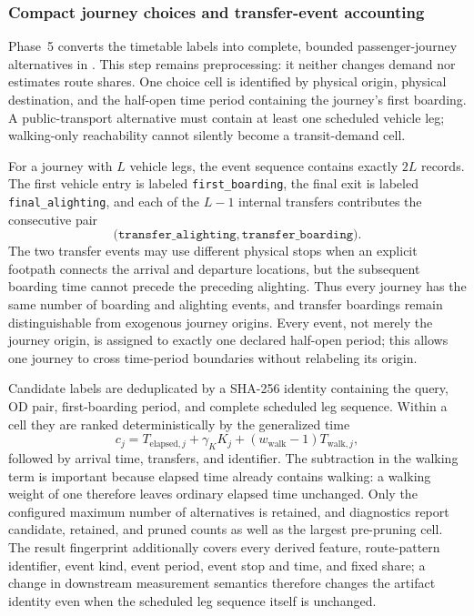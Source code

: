 \subsubsection{Compact journey choices and transfer-event accounting}
\label{sec:reduced-od-journey-choices}

Phase~5 converts the timetable labels into complete, bounded passenger-journey
alternatives in
.  This
step remains preprocessing: it neither changes demand nor estimates route
shares.  One choice cell is identified by physical origin, physical
destination, and the half-open time period containing the journey's first
boarding.  A public-transport alternative must contain at least one scheduled
vehicle leg; walking-only reachability cannot silently become a transit-demand
cell.

For a journey with $L$ vehicle legs, the event sequence contains exactly $2L$
records.  The first vehicle entry is labeled
\texttt{first\_boarding}, the final exit is labeled
\texttt{final\_alighting}, and each of the $L-1$ internal transfers contributes
the consecutive pair
\[
\bigl(\texttt{transfer\_alighting},
      \texttt{transfer\_boarding}\bigr).
\]
The two transfer events may use different physical stops when an explicit
footpath connects the arrival and departure locations, but the subsequent
boarding time cannot precede the preceding alighting.  Thus every journey has
the same number of boarding and alighting events, and transfer boardings remain
distinguishable from exogenous journey origins.  Every event, not merely the
journey origin, is assigned to exactly one declared half-open period; this
allows one journey to cross time-period boundaries without relabeling its
origin.

Candidate labels are deduplicated by a SHA-256 identity containing the query,
OD pair, first-boarding period, and complete scheduled leg sequence.  Within a
cell they are ranked deterministically by the generalized time
\[
c_j=T_{\mathrm{elapsed},j}
    +\gamma_K K_j
    +(w_{\mathrm{walk}}-1)T_{\mathrm{walk},j},
\]
followed by arrival time, transfers, and identifier.  The subtraction in the
walking term is important because elapsed time already contains walking: a
walking weight of one therefore leaves ordinary elapsed time unchanged.  Only
the configured maximum number of alternatives is retained, and diagnostics
report candidate, retained, and pruned counts as well as the largest
pre-pruning cell.
The result fingerprint additionally covers every derived feature, route-pattern
identifier, event kind, event period, event stop and time, and fixed share; a
change in downstream measurement semantics therefore changes the artifact
identity even when the scheduled leg sequence itself is unchanged.

